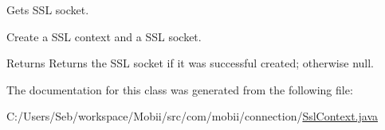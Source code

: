 Gets S\-S\-L socket. 

Create a S\-S\-L context and a S\-S\-L socket. \begin{DoxyReturn}{Returns}
Returns the S\-S\-L socket if it was successful created; otherwise null. 
\end{DoxyReturn}


The documentation for this class was generated from the following file\-:\begin{DoxyCompactItemize}
\item 
C\-:/\-Users/\-Seb/workspace/\-Mobii/src/com/mobii/connection/\hyperlink{_ssl_context_8java}{Ssl\-Context.\-java}\end{DoxyCompactItemize}
